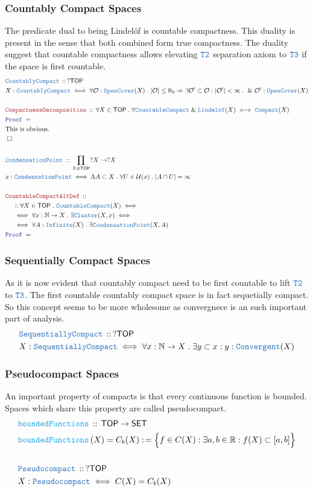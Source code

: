 \documentclass[12pt]{scrartcl}
\newcommand{\TYPE}[1]{\textcolor{NavyBlue}{\mathtt{#1}}}
\newcommand{\FUNC}[1]{\textcolor{Cerulean}{\mathtt{#1}}}
\newcommand{\LOGIC}[1]{\textcolor{Blue}{\mathtt{#1}}}
\newcommand{\THM}[1]{\textcolor{Maroon}{\mathtt{#1}}}
\renewcommand{\.}{\; . \;}
\newcommand{\de}{: \kern 0.1pc =}
\newcommand{\Act}[1]{\left( #1 \right)}
\newcommand{\Theorem}[2]{& \THM{#1} \, :: \, #2 \\ & \Proof = \\ }
\newcommand{\DeclareType}[2]{& \TYPE{#1} \, :: \, #2 \\}
\newcommand{\DefineType}[3]{& #1 : \TYPE{#2} \iff #3 \\}
\newcommand{\DeclareFunc}[2]{& \FUNC{#1} \, :: \, #2 \\}
\newcommand{\DefineNamedFunc}[4]{&  \FUNC{#1}\Act{#2} = #3 \de #4 \\}
\newcommand{\NewLine}{\\ & \kern 1pc}
\newcommand{\Page}[1]{ \begin{align*} #1 \end{align*}   }
\newcommand{\Explain}[1]{& \text{#1.} \\}
\renewcommand{\And}{\; \& \;}
\newcommand{\Imply}{\Rightarrow}
\newcommand{\Reals}{\mathbb{R} }
\newcommand{\Nat}{\mathbb{N} }
\newcommand{\QED}{\; \square}
\newcommand{\EndProof}{& \QED \\}
\newcommand{\Proof}{\LOGIC{Proof} \; }
\newcommand{\SET}{\mathsf{SET}}
\newcommand{\Cluster}{\TYPE{Cluster}}
\newcommand{\Compact}{\TYPE{Compact}}
\newcommand{\Lindelof}{\TYPE{Lindel\ddot{o}f}}
\newcommand{\CCompact}{\TYPE{CountableCompact}}
\newcommand{\TOP}{\mathsf{TOP}}
\renewcommand{\U}{\mathcal{U}}
\renewcommand{\O}{\mathcal{O}}
\begin{document}
\subsubsection{Countably Compact Spaces}
The predicate dual to being Lindel\"of is countable compactness. This duality is present in the sense that both combined form true compactness. The duality suggest that countable compactness allows elevating $\TYPE{T2}$ separation axiom to $\TYPE{T3}$ if the space is first countable.
\Page{
	\DeclareType{CountablyCompact}{?\TOP}
	\DefineType{X}{CountablyCompact}{
			\forall \O : \TYPE{OpenCover}(X) \. 
			|\O| \le \aleph_0 \Imply \exists \O' \subset \O : |\O'| < \infty \. 
			\And \O' : \TYPE{OpenCover}(X) 
		}
	\\
	\Theorem{CompactnessDecomposition}
	{
		\forall X \in \TOP \.
		\forall \CCompact \And \Lindelof(X) 
		\iff
		\Compact(X)
	}
	\Explain{This is obvious}
	\EndProof
	\\
	\DeclareType{CondensationPoint}
	{
		\prod_{ X \in \TOP }
		?X \to ?X
	}
	\DefineType{x}{CondensationPoint}
	{
		\Lambda A \subset X \. \forall U \in \U(x) \. |A \cap U| = \infty 
	}
	\\
	\Theorem{CountableCompactAltDef}
	{
		\NewLine ::		
		\forall X \in \TOP \.
		\CCompact(X)
		\iff  \NewLine \iff
	 	\forall x : \Nat \to X \. \exists \Cluster(X,x)
	 	\iff \NewLine \iff
	 	\forall  A : \TYPE{Infinite}(X) \. \exists \TYPE{CondensationPoint}(X,A)
	}
}
\newpage
\subsubsection{Sequentially Compact Spaces }
As it is now evident that countably compact need to be first countable to lift 
$\TYPE{T2}$ to $\TYPE{T3}$. 
The first countable countably compact space is in fact sequetially compact.
So this concept seems to be more wholesome as convergnece is an such 
important part of analysis. 
\Page{
	\DeclareType{SequentiallyCompact}{?\TOP}
	\DefineType{X}{SequentiallyCompact}{\forall x : \Nat \to X \. \exists y \subset x : y : \TYPE{Convergent}(X)}
}
\newpage
\subsubsection{Pseudocompact Spaces}
An important property of compacts is that every continuous function is bounded. 
Spaces which share this property are called pseudocompact.
\Page{
	\DeclareFunc{boundedFunctions}{\TOP \to \SET}
	\DefineNamedFunc{boundedFunctions}{X}{C_b(X)}{\Big\{ f \in C(X) : \exists a,b \in \Reals : f(X) \subset [a,b] \Big\}}
	\\
	\DeclareType{Pseudocompact}{?\TOP}
	\DefineType{X}{Pseudocompact}{ C(X)  = C_b(X)}
}
\newpage
\end{document}
